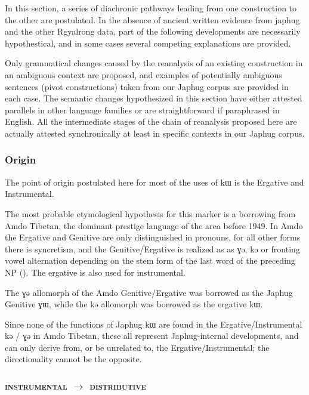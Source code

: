 \documentclass[oldfontcommands,oneside,a4paper,11pt]{article}
\newcommand{\ipa}[1]{{\phon #1}} %
\begin{document}
In this section, a series of diachronic pathways leading from one construction to the other are postulated. In the absence of ancient written evidence from japhug and the other Rgyalrong data, part of the following developments are necessarily hypothestical, and in some cases several competing explanations are provided.


Only grammatical changes caused by the reanalysis of an existing construction in an ambiguous context are proposed, and examples of potentially ambiguous sentences (pivot constructions) taken from our Japhug corpus are provided in each case. The semantic changes hypothesized in this section  have either attested parallels in other language families or are straightforward if paraphrased in English. All the intermediate stages of the chain of reanalysis proposed here are actually attested synchronically at least in specific contexts in our Japhug corpus.


 \subsubsection{Origin}
The point of origin postulated here for most of the uses of \ipa{kɯ} is the Ergative and Instrumental. 

The most probable etymological hypothesis for this marker is a borrowing from Amdo Tibetan, the dominant prestige  language of the area before 1949. In Amdo the Ergative and Genitive are only distinguished in pronouns, for all other forms there is syncretism, and the Genitive/Ergative is realized as as \ipa{ɣə}, \ipa{kə} or fronting vowel alternation depending on the stem form of the last word of the preceding NP (\citealt[62]{haller04themchen}). The ergative is also used for instrumental.

The \ipa{ɣə} allomorph of the Amdo Genitive/Ergative was borrowed as the Japhug Genitive \ipa{ɣɯ}, while the \ipa{kə} allomorph was borrowed  as the ergative \ipa{kɯ}. 

Since none of the functions of Japhug \ipa{kɯ} are found in the Ergative/Instrumental \ipa{kə} / \ipa{ɣə} in Amdo Tibetan, these all represent Japhug-internal developments, and can only derive from, or be unrelated to, the Ergative/Instrumental; the directionality cannot be the opposite.



 \subsubsection{\textsc{instrumental} $\rightarrow$ \textsc{distributive} }
  
\end{document}
